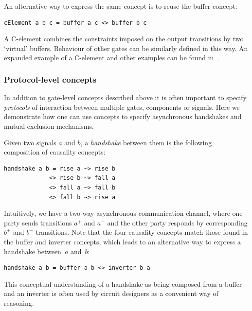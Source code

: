 \documentclass[british,conference,compsoc]{IEEEtran}
\begin{document}
An alternative way to express the same concept is to reuse the buffer concept:

\begin{verbatim}
cElement a b c = buffer a c <> buffer b c
\end{verbatim}

A C-element combines the constraints imposed on the output
transitions by two `virtual' buffers. Behaviour of other gates can be similarly
defined in this way. An expanded example of a C-element and other examples can 
be found in~\cite{2015_Beaumont_MEMOCODE}.

\vspace{-2mm}

\subsubsection{Protocol-level concepts} In addition to gate-level concepts
described above it is often important to specify \emph{protocols}
of interaction between multiple gates, components or signals. Here we 
demonstrate how one can use concepts to specify asynchronous handshakes
and mutual exclusion mechanisms.

Given two signals $a$ and $b$, a \emph{handshake} between them is
the following composition of causality concepts:

\begin{verbatim}
handshake a b = rise a ~> rise b 
             <> rise b ~> fall a 
             <> fall a ~> fall b 
             <> fall b ~> rise a
\end{verbatim}

Intuitively, we have a two-way asynchronous communication channel,
where one party sends transitions $a^{+}$ and $a^{-}$ and the other
party responds by corresponding $b^{+}$ and $b^{-}$ transitions.
Note that the four causality concepts match those found
in the buffer and inverter concepts, which leads to an alternative
way to express a handshake between~$a$ and~$b$:

\begin{verbatim}
handshake a b = buffer a b <> inverter b a
\end{verbatim}

This conceptual understanding of a handshake as being composed
from a buffer and an inverter is often used by circuit designers as
a convenient way of reasoning.

\vspace{-2mm}
\end{document}
